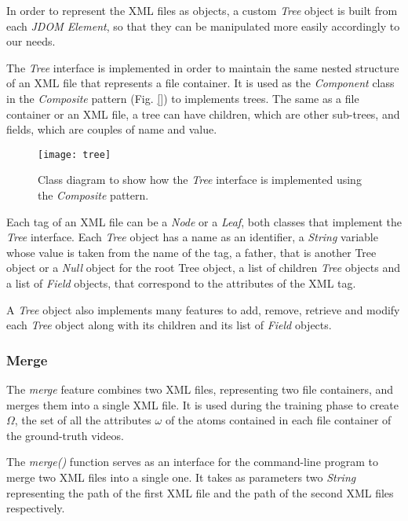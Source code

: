 In order to represent the XML files as objects, a custom \emph{Tree} object is built from each \emph{JDOM Element}, so that they can be manipulated more easily accordingly to our needs.

The \emph{Tree} interface is implemented in order to maintain the same nested structure of an XML file that represents a file container. It is used as the \emph{Component} class in the \emph{Composite} pattern (Fig. \ref{}) to implements trees. The same as a file container or an XML file, a tree can have children, which are other sub-trees, and fields, which are couples of name and value.

\begin{figure}
  \centering
  \texttt{[image: tree]}
  \caption{Class diagram to show how the \emph{Tree} interface is implemented using the \emph{Composite} pattern.}\label{fig:tree}
\end{figure}

Each tag of an XML file can be a \emph{Node} or a \emph{Leaf}, both classes that implement the \emph{Tree} interface. Each \emph{Tree} object has a name as an identifier, a \emph{String} variable whose value is taken from the name of the tag, a father, that is another Tree object or a \emph{Null} object for the root Tree object, a list of children \emph{Tree} objects and a list of \emph{Field} objects, that correspond to the attributes of the XML tag.

A \emph{Tree} object also implements many features to add, remove, retrieve and modify each \emph{Tree} object along with its children and its list of \emph{Field} objects.

\subsubsection*{Merge}

The \emph{merge} feature combines two XML files, representing two file containers, and merges them into a single XML file. It is used during the training phase to create $\Omega$, the set of all the attributes $\omega$ of the atoms contained in each file container of the ground-truth videos.

The \emph{merge()} function serves as an interface for the command-line program to merge two XML files into a single one. It takes as parameters two \emph{String} representing the path of the first XML file and the path of the second XML files respectively.

